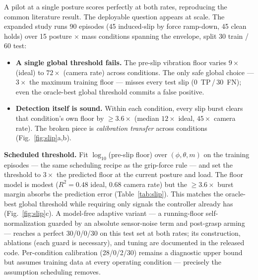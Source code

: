 \documentclass[journal]{IEEEtran}
\begin{document}
A pilot at a single posture scores perfectly at both rates, reproducing the
common literature result. The deployable question appears at scale. The
expanded study runs 90 episodes (45 induced-slip by force ramp-down, 45
clean holds) over 15 posture $\times$ mass conditions spanning the
envelope, split 30 train / 60 test:
\begin{itemize}
  \item \textbf{A single global threshold fails.} The pre-slip vibration
    floor varies $9\times$ (ideal) to $72\times$ (camera rate) across
    conditions. The only safe global choice --- $3\times$ the maximum
    training floor --- misses every test slip (0~TP\,/\,30~FN); even the
    oracle-best global threshold commits a false positive.
  \item \textbf{Detection itself is sound.} Within each condition, every
    slip burst clears that condition's own floor by ${\ge}3.6\times$
    (median $12\times$ ideal, $45\times$ camera rate). The broken piece is
    \emph{calibration transfer} across conditions
    (Fig.~\ref{fig:slip}a,b).
\end{itemize}

\textbf{Scheduled threshold.} Fit $\log_{10}$(pre-slip floor) over
$(\phi,\theta,m)$ on the training episodes --- the same scheduling recipe
as the grip-force rule --- and set the threshold to $3\times$ the predicted
floor at the current posture and load. The floor model is modest
($R^2 = 0.48$ ideal, 0.68 camera rate) but the ${\ge}3.6\times$ burst
margin absorbs the prediction error (Table~\ref{tab:slip}). This matches
the oracle-best global threshold while requiring only signals the
controller already has (Fig.~\ref{fig:slip}c). A model-free adaptive
variant --- a running-floor self-normalization guarded by an absolute
sensor-noise term and post-grasp arming --- reaches a perfect 30/0/0/30 on
this test set at both rates; its construction, ablations (each guard is
necessary), and tuning are documented in the released code. Per-condition
calibration (28/0/2/30) remains a diagnostic upper bound but assumes
training data at every operating condition --- precisely the assumption
scheduling removes.

\begin{table}[t]
  \caption{Scheduled-threshold slip detection on the 60-episode test set
    (30 slip, 30 clean-hold). UB = 95\,\% upper bound.}
  \label{tab:slip}
  \centering
  \setlength{\tabcolsep}{3pt}
\end{table}
\end{document}
